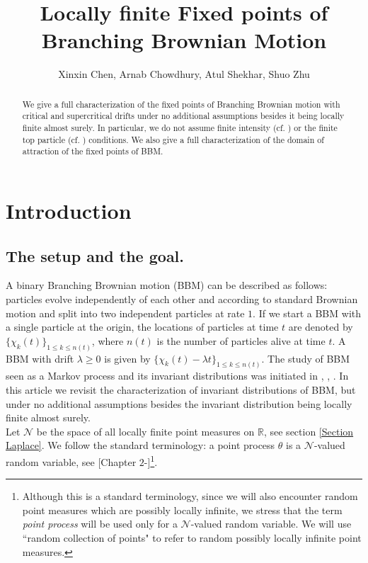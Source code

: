 \documentclass[a4paper,reqno]{amsart}%
\title{Locally finite Fixed points of Branching Brownian Motion}
\author{Xinxin Chen, Arnab Chowdhury, Atul Shekhar, Shuo Zhu}
\newcommand{\1}{\mathbf 1}
\theoremstyle{mine}
\numberwithin{theorem}{section}
\numberwithin{equation}{section}
\theoremstyle{remark}
\begin{document}
\begin{abstract}

We give a full characterization of the fixed points of Branching Brownian motion with critical and supercritical drifts under no additional assumptions besides it being locally finite almost surely. In particular, we do not assume finite intensity (cf. \cite{Kabluchko}) or the finite top particle (cf. \cite{Shekhar_FP}) conditions. We also give a full characterization of the domain of attraction of the fixed points of BBM.    

\end{abstract}
\maketitle
\section{Introduction}\label{Section Intro}
 
 \subsection{The setup and the goal.}
 A binary Branching Brownian motion (BBM) can be described as follows: particles evolve independently of each other and according to standard Brownian motion and split into two independent particles at rate $1$. If we start a BBM with a single particle at the origin, the locations of particles at time $t$ are denoted by $\{\chi_k(t)\}_{1 \le k \le n(t)}$, where $n(t)$ is the number of particles alive at time $t$. A BBM with drift $\lambda \geq 0$ is given by $\{\chi_k(t) - \lambda t \}_{1 \le k \le n(t)}$. The study of BBM seen as a Markov process and its invariant distributions was initiated in \cite{Kabluchko}, \cite{Shekhar_FP}, \cite{Shekhar_Domain}. In this article we revisit the characterization of invariant distributions of BBM, but under no additional assumptions besides the invariant distribution being locally finite almost surely. \\
 
 
 Let $\mathcal{N}$ be the space of all locally finite point measures on $\mathbb{R}$, see section \ref{Section Laplace}. We follow the standard terminology: a point process $\theta$ is a $\mathcal{N}$-valued random variable, see [Chapter $2$-\cite{Bovier_book}]\footnote{Although this is a standard terminology, since we will also encounter random point measures which are possibly locally infinite, we stress that the term \textit{point process} will be used only for a $\mathcal{N}$-valued random variable. We will use ``random collection of points" to refer to random possibly locally infinite point measures.}. 
 
\end{document}
